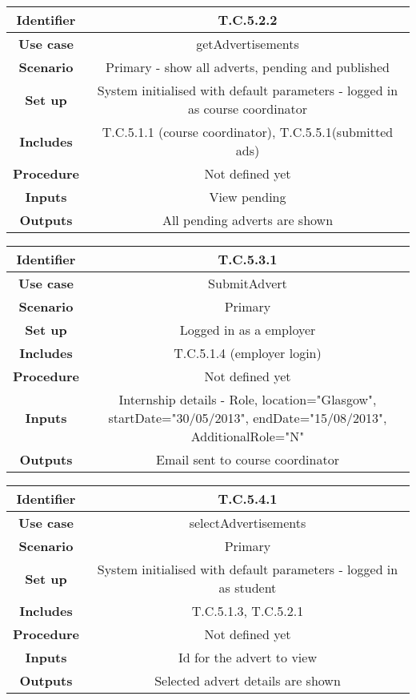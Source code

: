\begin{tabular}{|c|c|}
\hline \textbf{Identifier} & T.C.5.2.2 \\
\hline \textbf{Use case} & getAdvertisements\\
\hline \textbf{Scenario} & Primary - show all adverts, pending and published\\
\hline \textbf{Set up} & System initialised with default parameters - logged in as course coordinator\\
\hline \textbf{Includes} &T.C.5.1.1 (course coordinator), T.C.5.5.1(submitted ads)\\
\hline \textbf{Procedure} & Not defined yet\\
\hline \textbf{Inputs} & View pending\\
\hline \textbf{Outputs} & All pending adverts are shown\\
\hline
\end{tabular}

\begin{tabular}{|c|c|}
\hline \textbf{Identifier} & T.C.5.3.1\\
\hline \textbf{Use case} & SubmitAdvert\\
\hline \textbf{Scenario} & Primary\\
\hline \textbf{Set up} & Logged in as a employer\\
\hline \textbf{Includes} & T.C.5.1.4 (employer login)\\
\hline \textbf{Procedure} & Not defined yet\\
\hline \textbf{Inputs} & Internship details - Role, location="Glasgow", startDate="30/05/2013", endDate="15/08/2013", AdditionalRole="N"\\
\hline \textbf{Outputs} & Email sent to course coordinator\\
\hline
\end{tabular}

\begin{tabular}{|c|c|}
\hline \textbf{Identifier} & T.C.5.4.1\\
\hline \textbf{Use case} & selectAdvertisements\\
\hline \textbf{Scenario} & Primary\\
\hline \textbf{Set up} & System initialised with default parameters - logged in as student\\
\hline \textbf{Includes} & T.C.5.1.3, T.C.5.2.1\\
\hline \textbf{Procedure} & Not defined yet\\
\hline \textbf{Inputs} & Id for the advert to view\\
\hline \textbf{Outputs} & Selected advert details are shown\\
\hline
\end{tabular}

